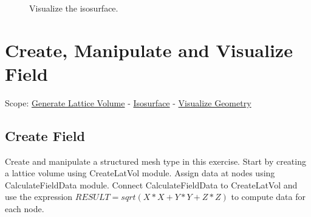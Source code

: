 \documentclass[fleqn,11pt,openany]{book}
\begin{document}
\begin{figure}[H]
\caption{Visualize the isosurface.}
\label{fig:viewisosurf}
\end{figure}

\chapter{Create, Manipulate and Visualize Field}

\begin{introduction}
Scope: \hyperref[createfield]{Generate Lattice Volume} - \hyperref[isosurface2]{Isosurface} -
\hyperref[]{Visualize Geometry}
\end{introduction}

\section{Create Field}\label{createfield}

Create and manipulate a structured mesh type in this exercise.
Start by creating a lattice volume using CreateLatVol module.
Assign data at nodes using CalculateFieldData module.
Connect CalculateFieldData to CreateLatVol and use the expression $RESULT = sqrt(X*X + Y*Y + Z*Z)$ to compute data for each node.
\end{document}
